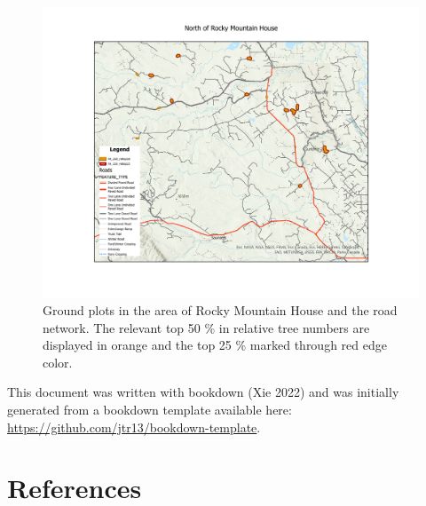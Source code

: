\documentclass[
]{article}
\begin{document}
\begin{figure}

{\centering \includegraphics[width=0.8\linewidth]{../graphics/North-of-RMH} 

}

\caption{Ground plots in the area of Rocky Mountain House and the road network. The relevant top 50 \% in relative tree numbers are displayed in orange and the top 25 \% marked through red edge color.}\label{fig:AoIRMH}
\end{figure}

This document was written with bookdown (Xie 2022) and was initially generated from a bookdown template available here: \url{https://github.com/jtr13/bookdown-template}.

\hypertarget{references}{%
\section{References}\label{references}}

\hypertarget{references}{}
\end{document}
